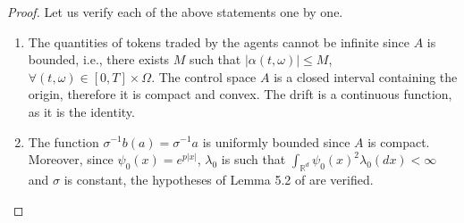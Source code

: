 \documentclass[11pt]{article}
\theoremstyle{definition}
\begin{document}
\begin{proof}
    Let us verify each of the above statements one by one.
    \begin{enumerate}
        \item[\textbf{\hyperref[sup: S.1]{(S.1)}}] 
        The quantities of tokens traded by the agents cannot be infinite since \( A \) is bounded, i.e., there exists \( M \) such that \( |\alpha(t,\omega)| \leq M\),  \(\forall (t,\omega) \in [0,T] \times \Omega \). The control space \( A \) is a closed interval containing the origin, therefore it is compact and convex. The drift is a continuous function, as it is the identity.
        \item[\textbf{\hyperref[sup: S.2]{(S.2)}}] 
        The function \( \sigma^{-1}b(a) = \sigma^{-1} a \) is uniformly bounded since \( A \) is compact. Moreover, since \( \psi_0(x) = e^{p|x|} \), \( \lambda_0 \) is such that \( \int_{\mathbb{R}^d} \psi_0(x)^2 \lambda_0(dx) < \infty \) and \( \sigma \) is constant, the hypotheses of Lemma 5.2 of \citep{carmona2015weakmfgformulation} are verified.
    \end{enumerate}


\end{proof}
\end{document}
